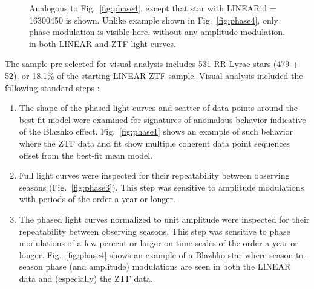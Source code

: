 \begin{figure}[ht]
    \centering
    \caption{Analogous to Fig.~\ref{fig:phase4}, except that star
    with LINEARid = 16300450 is shown. Unlike example shown in
    Fig.~\ref{fig:phase4},  only phase modulation is visible here,
    without any amplitude modulation, in both LINEAR and ZTF light curves.}
      \label{fig:phase5}
\end{figure}


The sample pre-selected for visual analysis includes 531 RR Lyrae stars (479 + 52),
or 18.1\% of the starting LINEAR-ZTF sample. Visual analysis included the following standard steps
\citep[e.g.,][]{2009MNRAS.400.1006J, 2017MNRAS.466.2602P}: 
\begin{enumerate}
\item The shape of the phased light curves and scatter of data points around the best-fit model were examined
    for signatures of anomalous behavior indicative of the Blazhko effect. 
    Fig.~\ref{fig:phase1} shows an example of such behavior where the ZTF data and fit show multiple coherent data point sequences
    offset from the best-fit mean model. 
  \item Full light curves were inspected for their repeatability between observing seasons (Fig.~\ref{fig:phase3}).
       This step was sensitive to amplitude modulations with periods of the order a year or longer.  
     \item The phased light curves normalized to unit amplitude were inspected for their repeatability between observing seasons.
       This step was sensitive to phase modulations of a few percent or larger on time scales of the order a year or longer.  
       Fig.~\ref{fig:phase4} shows an example of a Blazhko star where season-to-season phase (and amplitude) modulations
       are seen in both the LINEAR data and (especially) the ZTF data. 
\end{enumerate}

